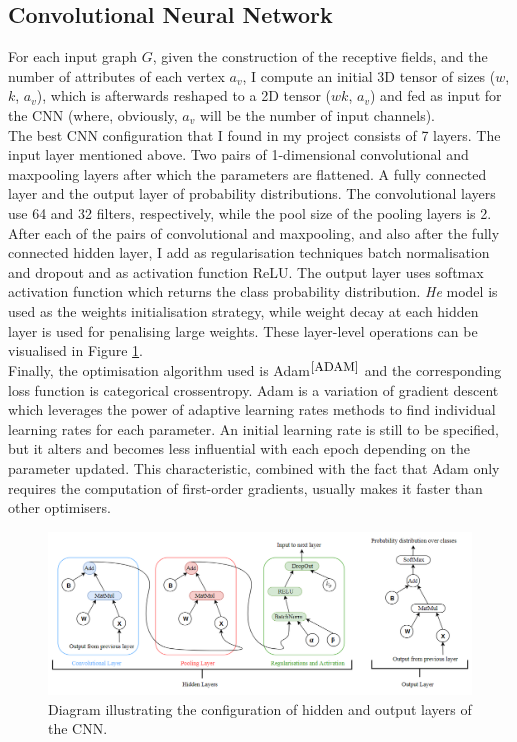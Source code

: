 \subsection{Convolutional Neural Network}

For each input graph $G$, given the construction of the receptive fields, and the number of attributes of each vertex $a_v$, I compute an initial 3D tensor of sizes ($w$, $k$, $a_v$), which is afterwards reshaped to a 2D tensor ($wk$, $a_v$) and fed as input for the CNN (where, obviously, $a_v$ will be the number of input channels). \\

The best CNN configuration that I found in my project consists of 7 layers. The input layer mentioned above. Two pairs of 1-dimensional convolutional and maxpooling layers after which the parameters are flattened. A fully connected layer and the output layer of probability distributions. The convolutional layers use 64 and 32 filters, respectively, while the pool size of the pooling layers is 2. \\

After each of the pairs of convolutional and maxpooling, and also after the fully connected hidden layer, I add as regularisation techniques batch normalisation and dropout and as activation function ReLU. The output layer uses softmax activation function which returns the class probability distribution. \textit{He} model is used as the weights initialisation strategy, while weight decay at each hidden layer is used for penalising large weights. These layer-level operations can be visualised in Figure \ref{cnn_layers}. \\

Finally, the optimisation algorithm used is Adam$^{\small \cite{ADAM}}$ and the corresponding loss function is categorical crossentropy. Adam is a variation of gradient descent which leverages the power of adaptive learning rates methods to find individual learning rates for each parameter. An initial learning rate is still to be specified, but it alters and becomes less influential with each epoch depending on the parameter updated. This characteristic, combined with the fact that Adam only requires the computation of first-order gradients, usually makes it faster than other optimisers.  \\


\begin{figure}[H]
  \centering
  \centerline{\includegraphics[scale=0.5]{Images/cnn_layers.png}}
  \caption{Diagram illustrating the configuration of hidden and output layers of the CNN.}
  \label{cnn_layers}
\end{figure}


